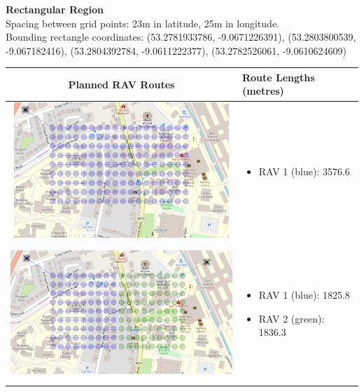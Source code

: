 \textbf{Rectangular Region}
\\Spacing between grid points: 23m in latitude, 25m in longitude.
\\Bounding rectangle coordinates: (53.2781933786, -9.0671226391), (53.2803800539, -9.067182416), (53.2804392784, -9.0611222377), (53.2782526061, -9.0610624609)
\\
\begin{table}[ht!]
  \centering
  \begin{tabular}{ | c | m{5cm} | }
    \hline
    Planned RAV Routes & Route Lengths (metres) \\
    \hline
    
    \begin{minipage}[c][53mm][c]{.6\textwidth}
      \includegraphics[width=\linewidth, height=51mm]{Chapters/MultiAgentCoverage/MultipleTravellingSalesman/Figs/Rectangle/SingleAgent.PNG}

    \end{minipage}
    &
    \begin{itemize}[leftmargin=*]
      \item[] RAV 1 (blue): 3576.6
    \end{itemize}
    \\
    \hline
    \begin{minipage}[c][53mm][c]{.6\textwidth}
      \includegraphics[width=\linewidth, height=51mm]{Chapters/MultiAgentCoverage/MultipleTravellingSalesman/Figs/Rectangle/TwoAgent.PNG}
    \end{minipage}
    &
    \begin{itemize}[leftmargin=*]
        \item[] RAV 1 (blue): 1825.8
        \item[] RAV 2 (green): 1836.3
    \end{itemize}
    \\
    \hline
    

\end{tabular}
\end{table}
